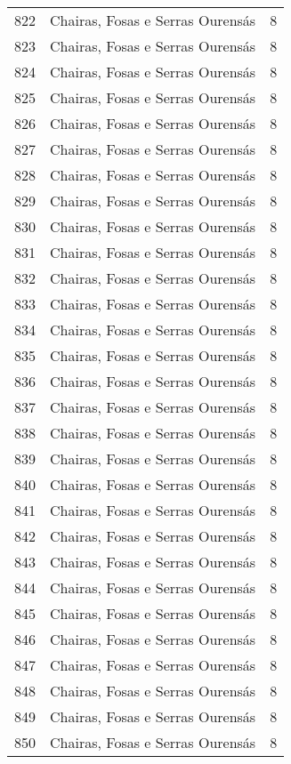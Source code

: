 \begin{table}[p]
\begin{tabular}{rlr}
  822 & Chairas, Fosas e Serras Ourensás &   8 \\ 
  823 & Chairas, Fosas e Serras Ourensás &   8 \\ 
  824 & Chairas, Fosas e Serras Ourensás &   8 \\ 
  825 & Chairas, Fosas e Serras Ourensás &   8 \\ 
  826 & Chairas, Fosas e Serras Ourensás &   8 \\ 
  827 & Chairas, Fosas e Serras Ourensás &   8 \\ 
  828 & Chairas, Fosas e Serras Ourensás &   8 \\ 
  829 & Chairas, Fosas e Serras Ourensás &   8 \\ 
  830 & Chairas, Fosas e Serras Ourensás &   8 \\ 
  831 & Chairas, Fosas e Serras Ourensás &   8 \\ 
  832 & Chairas, Fosas e Serras Ourensás &   8 \\ 
  833 & Chairas, Fosas e Serras Ourensás &   8 \\ 
  834 & Chairas, Fosas e Serras Ourensás &   8 \\ 
  835 & Chairas, Fosas e Serras Ourensás &   8 \\ 
  836 & Chairas, Fosas e Serras Ourensás &   8 \\ 
  837 & Chairas, Fosas e Serras Ourensás &   8 \\ 
  838 & Chairas, Fosas e Serras Ourensás &   8 \\ 
  839 & Chairas, Fosas e Serras Ourensás &   8 \\ 
  840 & Chairas, Fosas e Serras Ourensás &   8 \\ 
  841 & Chairas, Fosas e Serras Ourensás &   8 \\ 
  842 & Chairas, Fosas e Serras Ourensás &   8 \\ 
  843 & Chairas, Fosas e Serras Ourensás &   8 \\ 
  844 & Chairas, Fosas e Serras Ourensás &   8 \\ 
  845 & Chairas, Fosas e Serras Ourensás &   8 \\ 
  846 & Chairas, Fosas e Serras Ourensás &   8 \\ 
  847 & Chairas, Fosas e Serras Ourensás &   8 \\ 
  848 & Chairas, Fosas e Serras Ourensás &   8 \\ 
  849 & Chairas, Fosas e Serras Ourensás &   8 \\ 
  850 & Chairas, Fosas e Serras Ourensás &   8 \\ 

\end{tabular}
\end{table}
